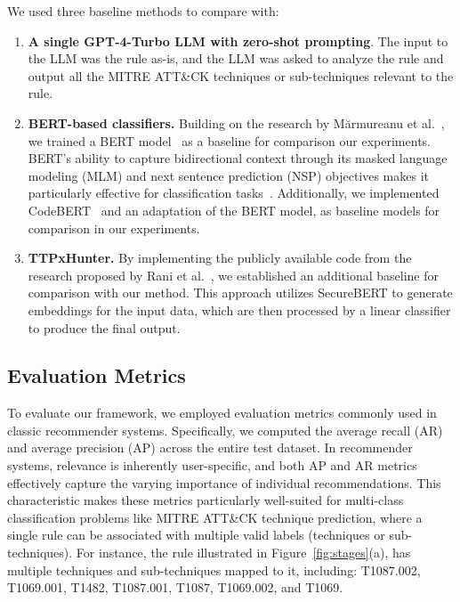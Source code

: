 We used three baseline methods to compare \methodName with:
\begin{enumerate}[nosep,leftmargin=*]
    \item \textbf{A single GPT-4-Turbo LLM with zero-shot prompting}.
    The input to the LLM was the rule as-is, and the LLM was asked to analyze the rule and output all the MITRE ATT\&CK techniques or sub-techniques relevant to the rule.
    \item \textbf{BERT-based classifiers.} Building on the research by Mărmureanu et al.~\cite{10398612}, we trained a BERT model~\cite{devlin2018bert} as a baseline for comparison our experiments. 
    BERT's ability to capture bidirectional context through its masked language modeling (MLM) and next sentence prediction (NSP) objectives makes it particularly effective for classification tasks~\cite{sun2019fine}. 
    Additionally, we implemented CodeBERT~\cite{feng2020codebert} and an adaptation of the BERT model, as baseline models for comparison in our experiments.
    \item \textbf{TTPxHunter.} By implementing the publicly available code from the research proposed by Rani et al.~\cite{rani2024ttpxhunter}, we established an additional baseline for comparison with our method. 
    This approach utilizes SecureBERT to generate embeddings for the input data, which are then processed by a linear classifier to produce the final output.


\end{enumerate}

\subsection{Evaluation Metrics}

To evaluate our framework, we employed evaluation metrics commonly used in classic recommender systems. 
Specifically, we computed the average recall (AR) and average precision (AP) across the entire test dataset. 
In recommender systems, relevance is inherently user-specific, and both AP and AR metrics effectively capture the varying importance of individual recommendations. This characteristic makes these metrics particularly well-suited for multi-class classification problems like MITRE ATT\&CK technique prediction, where a single rule can be associated with multiple valid labels (techniques or sub-techniques).
For instance, the rule illustrated in Figure~\ref{fig:stages}(a), has multiple techniques and sub-techniques mapped to it, including: T1087.002, T1069.001, T1482, T1087.001, T1087, T1069.002, and T1069. 



